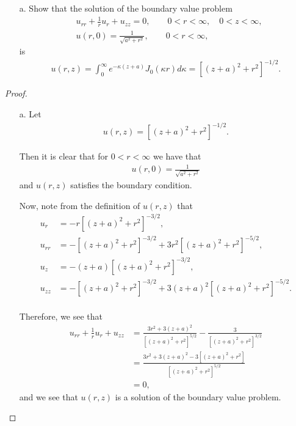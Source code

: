 \begin{problem}{7.2}
  \begin{enumerate}
    \item[a.] Show that the solution of the boundary value problem
      \begin{align*}
        &u_{rr} + \frac{1}{r}u_r + u_{zz} = 0, \qquad 0 < r <\infty, \quad 0 < z < \infty,\\
        &u(r, 0) = \frac{1}{\sqrt{a^2 + r^2}}, \qquad 0 < r <\infty,
      \end{align*}
      is
      \begin{align*}
        u(r, z) = \int_0^\infty e^{-\kappa(z+a)}J_0(\kappa r) d\kappa = \left[(z+a)^2 + r^2\right]^{-1/2}.
      \end{align*}
  \end{enumerate}
\end{problem}

\begin{proof}
  \begin{enumerate}
    \item[a.] Let
      \begin{align*}
        u(r, z) = \left[(z+a)^2 + r^2\right]^{-1/2}.
      \end{align*}

      Then it is clear that for $0 < r < \infty$ we have that
      \begin{align*}
        u(r, 0) = \frac{1}{\sqrt{a^2 + r^2}}
      \end{align*}
      and $u(r,z)$ satisfies the boundary condition.

      Now, note from the definition of $u(r, z)$ that
      \begin{align*}
        u_r &= -r\left[(z+a)^2 + r^2\right]^{-3/2}, \\
        u_{rr} &= -\left[(z+a)^2 + r^2\right]^{-3/2} + 3r^2 \left[(z+a)^2 + r^2\right]^{-5/2}, \\
        u_z &= -(z+a)\left[(z+a)^2 + r^2\right]^{-3/2}, \\
        u_{zz} &= -\left[(z+a)^2 + r^2\right]^{-3/2} + 3(z+a)^2 \left[(z+a)^2 + r^2\right]^{-5/2}. \\
      \end{align*}

      Therefore, we see that
      \begin{align*}
        u_{rr} + \frac{1}{r}u_r + u_{zz} & =\frac{3r^2 + 3(z+a)^2}{\left[(z+a)^2 + r^2\right]^{5/2}} - \frac{3}{\left[(z+a)^2 + r^2\right]^{3/2}} \\
        &= \frac{3r^2 + 3(z+a)^2 - 3\left[(z+a)^2 + r^2\right]}{\left[(z+a)^2 + r^2\right]^{5/2}}\\
        &= 0,
      \end{align*}
      and we see that $u(r, z)$ is a solution of the boundary value problem.
  \end{enumerate}
\end{proof}
\newpage
